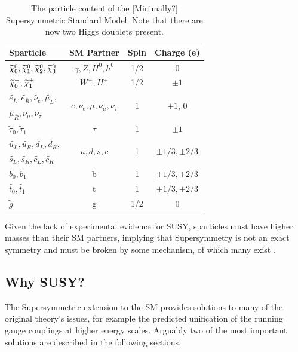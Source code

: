 \begin{table}[h!]
  \caption{The particle content of the [Minimally?] Supersymmetric Standard
  Model. Note that there are now two Higgs doublets present.\label{tab:susy_particles}}
  \centering
  \small
  \begin{tabular}{ lccc }
    \hline
    \hline
    Sparticle         & SM Partner  & Spin & Charge (e) \\
    \hline
    $\widetilde{\chi}^{0}_0, \widetilde{\chi}^{0}_1, \widetilde{\chi}^{0}_2, \widetilde{\chi}^{0}_3$ & $\gamma, Z, H^0, h^0$ & 1/2 & 0 \\  
    $\widetilde{\chi}^{\pm}_0, \widetilde{\chi}^{\pm}_1$ & $W^{\pm}, H^{\pm}$ & 1/2 & $\pm1$ \\
    
    $\widetilde{e_{\bar{L}}}, \widetilde{e_{\bar{R}}},
    \widetilde{\nu_e},
    \widetilde{\mu_{\bar{L}}},$ &\multirow{2}{*}{$e, \nu_{e}, \mu, \nu_{\mu}, \nu_{\tau}$}&\multirow{2}{*}{1} & \multirow{2}{*}{$\pm 1$, 0} \\
    $ \widetilde{\mu_{\bar{R}}}, \widetilde{\nu_{\mu}},
    \widetilde{\nu_{\tau}}$ &&&\\
    
    $\widetilde{\tau}_0, \widetilde{\tau}_1$ & $\tau$ & 1  & $\pm 1$ \\
    

    $\widetilde{u_L}, \widetilde{u_R}, \widetilde{d_L},
    \widetilde {d_R},$& \multirow{2}{*}{$u, d, s, c$} & \multirow{2}{*}{1} & \multirow{2}{*}{$\pm 1/3, \pm 2/3$} \\
    $\widetilde{s_L}, \widetilde{s_R}, \widetilde{c_L}, \widetilde{c_R}$ &&& \\
    $\widetilde{b_0}, \widetilde{b_1}$ & b & 1 & $\pm 1/3, \pm 2/3$ \\
    $\widetilde{t_0}, \widetilde{t_1}$ & t & 1 & $\pm 1/3, \pm 2/3$ \\
    $\widetilde{g}$ & g & 1/2 & 0 \\
    \hline
    \hline
  \end{tabular}
\end{table}

Given the lack of experimental evidence for SUSY, sparticles must
have higher masses than their SM partners, implying that Supersymmetry is not
an exact symmetry and must be broken by some mechanism, of which many
exist \cite{ref:hierarchy1,ref:hierarchy2}.



\subsection{Why SUSY?}
The Supersymmetric extension to the SM provides solutions to many of the
original theory's issues, for example the predicted unification of the running
gauge couplings at higher energy scales. Arguably two of the most important
solutions are described in the following sections.

